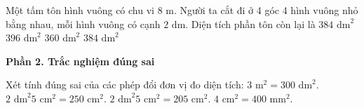 \begin{ex} %
Một tấm tôn hình vuông có chu vi $8\text{ m}$. Người ta cắt đi ở 4 góc 4 hình vuông nhỏ bằng nhau, mỗi hình vuông có cạnh $2\text{ dm}$. Diện tích phần tôn còn lại là
\choice
{$384\text{ dm}^2$}
{$396\text{ dm}^2$}
{$360\text{ dm}^2$}
{\True $384\text{ dm}^2$}
\end{ex}

\textbf{Phần 2. Trắc nghiệm đúng sai}

\begin{ex} %
Xét tính đúng sai của các phép đổi đơn vị đo diện tích:
\choiceTF
{\True $3\text{ m}^2 = 300\text{ dm}^2$.}
{$2\text{ dm}^2 5\text{ cm}^2 = 250\text{ cm}^2$.}
{\True $2\text{ dm}^2 5\text{ cm}^2 = 205\text{ cm}^2$.}
{\True $4\text{ cm}^2 = 400\text{ mm}^2$.}
\end{ex}

